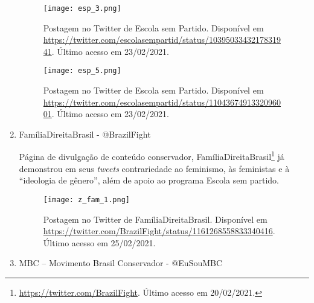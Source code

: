 \documentclass[
	12pt,				%
	openright,			%
	twoside,			%
	a4paper,			%
	english,			%
	brazil				%
	]{abntex2}
\begin{document}
\begin{anexosenv}
\begin{enumerate}
 
 \begin{figure}[!htbp]
    \centering
    \texttt{[image: esp\_3.png]}
    \caption{Postagem no Twitter de Escola sem Partido. Disponível em \url{https://twitter.com/escolasempartid/status/1039503343217831941}. Último acesso em 23/02/2021.}
 \end{figure}
 
 \begin{figure}[!htbp]
    \centering
    \texttt{[image: esp\_5.png]}
    \caption{Postagem no Twitter de Escola sem Partido. Disponível em \url{https://twitter.com/escolasempartid/status/1104367491332096001}. Último acesso em 23/02/2021.}
 \end{figure}
 
  \newpage
  
 \item FamíliaDireitaBrasil - @BrazilFight
 
 Página de divulgação de conteúdo conservador, FamíliaDireitaBrasil\footnote{\url{https://twitter.com/BrazilFight}. Último acesso em 20/02/2021.} já demonstrou em seus \textit{tweets} contrariedade ao feminismo, às feministas e à ``ideologia de gênero'', além de apoio ao programa Escola sem partido.
 
 \begin{figure}[!htbp]
    \centering
    \texttt{[image: z\_fam\_1.png]}
    \caption{Postagem no Twitter de FamíliaDireitaBrasil. Disponível em \url{https://twitter.com/BrazilFight/status/1161268558833340416}. Último acesso em 25/02/2021.}
 \end{figure}
  
 \item MBC – Movimento Brasil Conservador - @EuSouMBC
 

\end{enumerate}
\end{anexosenv}
\end{document}
